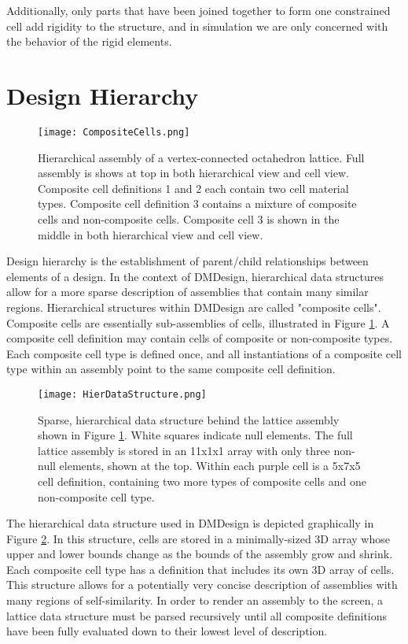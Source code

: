 {Additionally, only parts that have been joined together to form one constrained cell add rigidity to the structure, and in simulation we are only concerned with the behavior of the rigid elements.\\

\section{Design Hierarchy}

\begin{figure}
  \texttt{[image: CompositeCells.png]}
  \caption{Hierarchical assembly of a vertex-connected octahedron lattice.  Full assembly is shows at top in both hierarchical view and cell view.  Composite cell definitions 1 and 2 each contain two cell material types.  Composite cell definition 3 contains a mixture of composite cells and non-composite cells.  Composite cell 3 is shown in the middle in both hierarchical view and cell view.}
  \label{fig:CompositeCells}
\end{figure}

Design hierarchy is the establishment of parent/child relationships between elements of a design.  In the context of DMDesign, hierarchical data structures allow for a more sparse description of assemblies that contain many similar regions.  Hierarchical structures within DMDesign are called "composite cells".\\

Composite cells are essentially sub-assemblies of cells, illustrated in Figure \ref{fig:CompositeCells}.  A composite cell definition may contain cells of composite or non-composite types.  Each composite cell type is defined once, and all instantiations of a composite cell type within an assembly point to the same composite cell definition.\\

\begin{figure}
  \texttt{[image: HierDataStructure.png]}
  \caption{Sparse, hierarchical data structure behind the lattice assembly shown in Figure \ref{fig:CompositeCells}.  White squares indicate null elements.  The full lattice assembly is stored in an 11x1x1 array with only three non-null elements, shown at the top. Within each purple cell is a 5x7x5 cell definition, containing two more types of composite cells and one non-composite cell type.}
  \label{fig:HierDataStructure}
\end{figure}

The hierarchical data structure used in DMDesign is depicted graphically in Figure \ref{fig:HierDataStructure}.  In this structure, cells are stored in a minimally-sized 3D array whose upper and lower bounds change as the bounds of the assembly grow and shrink.  Each composite cell type has a definition that includes its own 3D array of cells.  This structure allows for a potentially very concise description of assemblies with many regions of self-similarity.  In order to render an assembly to the screen, a lattice data structure must be parsed recursively until all composite definitions have been fully evaluated down to their lowest level of description.\\

}

